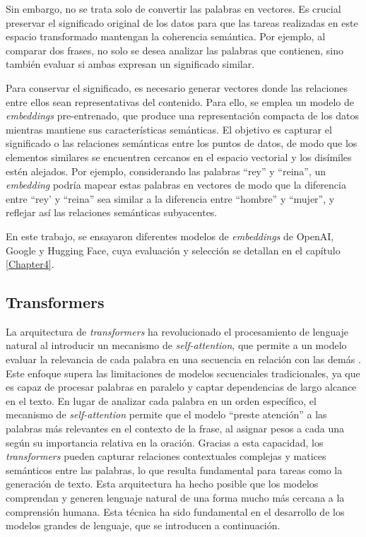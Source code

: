 Sin embargo, no se trata solo de convertir las palabras en vectores. Es crucial preservar el significado original 
de los datos para que las tareas realizadas en este espacio transformado mantengan la coherencia semántica. 
Por ejemplo, al comparar dos frases, no solo se desea analizar las palabras que contienen, sino también evaluar 
si ambas expresan un significado similar.

Para conservar el significado, es necesario generar vectores donde las relaciones entre ellos sean representativas 
del contenido. Para ello, se emplea un modelo de \textit{embeddings} pre-entrenado, que produce una representación compacta 
de los datos mientras mantiene sus características semánticas. El objetivo es capturar el significado o las relaciones 
semánticas entre los puntos de datos, de modo que los elementos similares se encuentren cercanos en el espacio vectorial y los disímiles estén alejados. 
Por ejemplo, considerando las palabras ``rey'' y ``reina'', un \textit{embedding} podría mapear estas palabras en vectores de modo 
que la diferencia entre ``rey' y ``reina'' sea similar a la diferencia entre ``hombre'' y ``mujer'', y reflejar así las 
relaciones semánticas subyacentes.

En este trabajo, se ensayaron diferentes modelos de \textit{embeddings} de OpenAI, Google y Hugging Face, 
cuya evaluación y selección se detallan en el capítulo \ref{Chapter4}.

\subsection{Transformers}

La arquitectura de \textit{transformers} ha revolucionado el procesamiento de lenguaje natural al introducir un mecanismo de \textit{self-attention}, 
que permite a un modelo evaluar la relevancia de cada palabra en una secuencia en relación con las demás \citep{paper:transformers}. Este enfoque 
supera las limitaciones de modelos secuenciales tradicionales, ya que es capaz de procesar palabras en paralelo y captar dependencias de largo alcance 
en el texto. En lugar de analizar cada palabra en un orden específico, el mecanismo de \textit{self-attention} permite que el modelo ``preste atención'' 
a las palabras más relevantes en el contexto de la frase, al asignar pesos a cada una según su importancia relativa en la oración. Gracias a esta capacidad, 
los \textit{transformers} pueden capturar relaciones contextuales complejas y matices semánticos entre las palabras, 
lo que resulta fundamental para tareas como la generación de texto. Esta arquitectura ha hecho posible que los modelos comprendan y generen 
lenguaje natural de una forma mucho más cercana a la comprensión humana. Esta técnica 
ha sido fundamental en el desarrollo de los modelos grandes de lenguaje, que se introducen a continuación.

